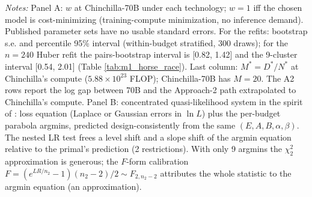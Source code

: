 \begin{table}[!htbp]
\begin{threeparttable}
\begin{tablenotes}[flushleft]
\item \textit{Notes:} Panel A: $w$ at Chinchilla-70B under each technology; $w=1$ iff the chosen model is cost-minimizing (training-compute minimization, no inference demand). Published parameter sets have no usable standard errors. For the refits: bootstrap s.e. and percentile 95\% interval (within-budget stratified, 300 draws); for the $n=240$ Huber refit the pairs-bootstrap interval is [0.82, 1.42] and the 9-cluster interval [0.54, 2.01] (Table \ref{tab:m1_horse_race}). Last column: $M^*=D^*/N^*$ at Chinchilla's compute ($5.88\times10^{23}$ FLOP); Chinchilla-70B has $M=20$. The A2 rows report the log gap between 70B and the Approach-2 path extrapolated to Chinchilla's compute. Panel B: concentrated quasi-likelihood system in the spirit of \citet{leonledesma2010identifying}: loss equation (Laplace or Gaussian errors in $\ln L$) plus the per-budget parabola argmins, predicted design-consistently from the same $(E,A,B,\alpha,\beta)$. The nested LR test frees a level shift and a slope shift of the argmin equation relative to the primal's prediction (2 restrictions). With only 9 argmins the $\chi^2_2$ approximation is generous; the $F$-form calibration $F=(e^{LR/n_2}-1)(n_2-2)/2\sim F_{2,n_2-2}$ attributes the whole statistic to the argmin equation (an approximation).
\end{tablenotes}
\end{threeparttable}
\end{table}
